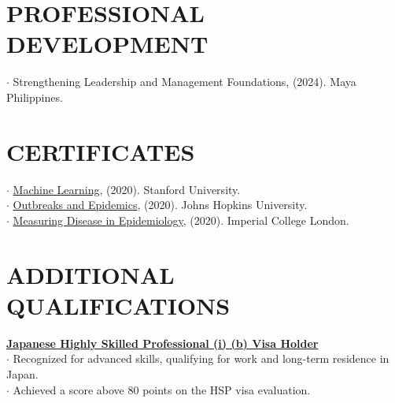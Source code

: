 \documentclass[margin]{res}
\begin{document}
\begin{resume}

\section{PROFESSIONAL DEVELOPMENT}
$\cdot$ Strengthening Leadership and Management Foundations, (2024). Maya Philippines.\\

\section{CERTIFICATES}
$\cdot$ \href{https://www.coursera.org/account/accomplishments/verify/VLPA48SZ9NQP}{Machine Learning}, (2020). Stanford University. \\
$\cdot$ \href{https://www.coursera.org/account/accomplishments/verify/KACYHT3CLLHQ}{Outbreaks and Epidemics}, (2020). Johns Hopkins University. \\
$\cdot$ \href{https://www.coursera.org/account/accomplishments/verify/GF4H3CRX2TQS}{Measuring Disease in Epidemiology}, (2020). Imperial College London.

\section{ADDITIONAL\\QUALIFICATIONS}
\href{https://immigration-lawyer.co.jp/visa/highly_skilled/?language=eng}{\textbf{Japanese Highly Skilled Professional (i) (b) Visa Holder}}\\
$\cdot$ Recognized for advanced skills, qualifying for work and long-term residence in Japan.\\
$\cdot$ Achieved a score above 80 points on the HSP visa evaluation.




\end{resume}
\end{document}
